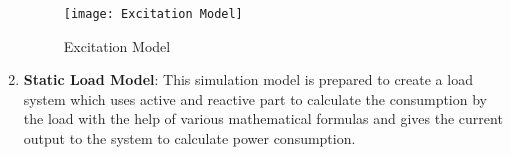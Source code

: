 \begin{enumerate}
	\begin{figure}[H]
	 \centering
	\texttt{[image: Excitation Model]}
	\caption{Excitation Model}
	\label{Excitation Model}
	\end{figure}
	
%		
%		
%		
%		
%		
%				

\item \textbf{\large Static Load Model}: This simulation model is prepared to create a load system which uses active and reactive part to calculate the consumption by the load with the help of various mathematical formulas and gives the current output to the system to calculate power consumption.  
	

\end{enumerate}
